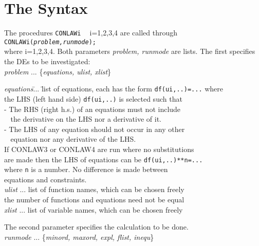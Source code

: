 \documentclass[12pt]{article}
\begin{document}
\section{The Syntax}
The procedures {\tt CONLAWi} $\;\;$ i=1,2,3,4 are called through \\
{\tt CONLAWi({\it problem,runmode}); } \\
where i=1,2,3,4. Both parameters {\it problem, runmode} are lists.
The first specifies the DEs to be investigated: \\
{\it problem} ... \{{\it equations, ulist, xlist}\}
\begin{tabbing}
\hspace{0.5cm}
 {\it equations}\= ... \= list of equations,
              each has the form {\tt df(ui,..)=...} where \\
       \>  \> the LHS (left hand side) {\tt df(ui,..)} is selected such that \\
       \>  \>  - The RHS (right h.s.) of an equations must not include     \\
       \>  \>$\;\;$ the derivative on the LHS nor a derivative of it.  \\
       \>  \>  - The LHS of any equation should not occur in any other\\
       \>  \>$\;\;$ equation nor any derivative of the LHS.  \\
       \>  \> If CONLAW3 or CONLAW4 are run where no substitutions\\
       \>  \> are made then the LHS of equations can be {\tt df(ui,..)**n=...}\\
       \>  \> where {\tt n} is a number. No difference is made between\\
       \>  \> equations and constraints. \\
\hspace{0.5cm}
 {\it ulist} \>  ... \> list of function names, which can be chosen freely \\
             \>      \> the number of functions and equations need not
be equal \\
\hspace{0.5cm}
 {\it xlist}  \>  ... \> list of variable names, which can be chosen freely 
\end{tabbing}
The second parameter specifies the calculation to be done.  \\
{\it runmode} ... \{{\it minord, maxord, expl, flist, inequ}\}
\end{document}
